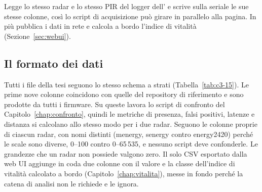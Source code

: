 Legge lo stesso radar e lo stesso PIR del logger dell'\ldb{} e scrive sulla seriale le sue stesse colonne, così lo script di acquisizione può girare in parallelo alla pagina. In più pubblica i dati in rete e calcola a bordo l'indice di vitalità (Sezione~\ref{sec:webui}).

\subsection{Il formato dei dati}
\label{sec:c3-4-3}

Tutti i file della tesi seguono lo stesso schema a strati (Tabella~\ref{tab:c3-15}). Le prime nove colonne coincidono con quelle del repository di riferimento e sono prodotte da tutti i firmware. Su queste lavora lo script di confronto del Capitolo~\ref{chap:confronto}, quindi le metriche di presenza, falsi positivi, latenze e distanza si calcolano allo stesso modo per i due radar. Seguono le colonne proprie di ciascun radar, con nomi distinti (menergy, senergy contro energy2420) perché le scale sono diverse, 0--100 contro 0--65\,535, e nessuno script deve confonderle. Le grandezze che un radar non possiede valgono zero. Il solo CSV esportato dalla web UI aggiunge in coda due colonne con il valore e la classe dell'indice di vitalità calcolato a bordo (Capitolo~\ref{chap:vitalita}), messe in fondo perché la catena di analisi non le richiede e le ignora.

